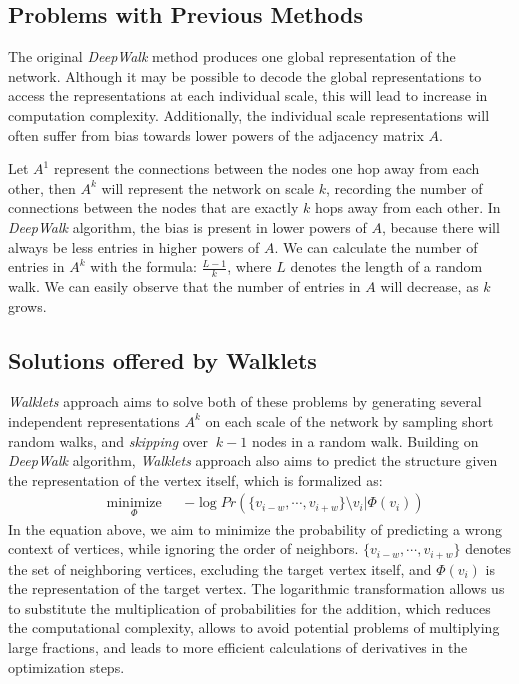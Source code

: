 \documentclass[a4paper,13pt]{article}
\begin{document}
\subsection{Problems with Previous Methods}
The original \textit{DeepWalk} method produces one global representation of the network. Although it may be possible to decode the global representations to access the representations at each individual scale, this will lead to increase in computation complexity. Additionally, the individual scale representations will often suffer from bias towards lower powers of the adjacency matrix $A$.

Let $A^1$ represent the connections between the nodes one hop away from each other, then $A^k$ will represent the network on scale $k$, recording the number of connections between the nodes that are exactly $k$ hops away from each other. In \textit{DeepWalk} algorithm, the bias is present in lower powers of $A$, because there will always be less entries in higher powers of $A$. We can calculate the number of entries in $A^k$ with the formula: $\frac{L-1}{k}$, where $L$ denotes the length of a random walk. We can easily observe that the number of entries in $A$ will decrease, as $k$ grows.

\subsection{Solutions offered by Walklets}
\textit{Walklets} approach aims to solve both of these problems by generating several independent representations $A^k$ on each scale of the network by sampling short random walks, and \textit{skipping} over $\ k-1 $ nodes in a random walk. Building on \textit{DeepWalk} algorithm, \textit{Walklets} approach also aims to predict the structure given the representation of the vertex itself, which is formalized as:
\begin{equation*}
\begin{aligned}
& \underset{\Phi}{\text{minimize}}
& & -\log Pr(\{v_{i-w}, \cdots, v_{i+w}\}\setminus v_i | \Phi(v_i))
\end{aligned}
\end{equation*}
In the equation above, we aim to minimize the probability of predicting a wrong context of vertices, while ignoring the order of neighbors. $\{v_{i-w}, \cdots, v_{i+w}\}$ denotes the set of neighboring vertices, excluding the target vertex itself, and $\Phi(v_i)$ is the representation of the target vertex. The logarithmic transformation allows us to substitute the multiplication of probabilities for the addition, which reduces the computational complexity, allows to avoid potential problems of multiplying large fractions, and leads to more efficient calculations of derivatives in the optimization steps.
\end{document}
